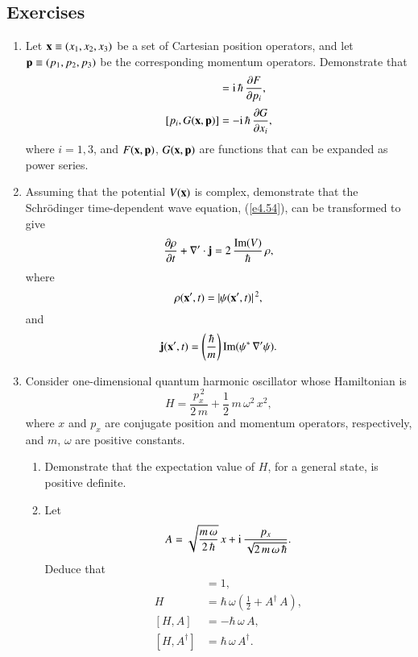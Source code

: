 \subsection*{Exercises}
\begin{enumerate}[label=\thechapter.\arabic*,leftmargin=*,widest=9.20]
\item Let  ${\bf x}\equiv (x_1, x_2, x_3)$ be a set of Cartesian position operators,  and let ${\bf p}\equiv (p_1, p_2, p_3)$ be
the corresponding momentum operators. Demonstrate that
\begin{align}
[x_i, F({\bf x},{\bf p})]& = {\rm i}\,\hbar \,\frac{\partial F}{\partial p_i},\nonumber\\[0.5ex]
[p_i, G({\bf x},{\bf p})]& = - {\rm i}\,\hbar\,\frac{\partial G}{\partial x_i},\nonumber
\end{align}
where $i=1,3$,  and $F({\bf x},{\bf p})$, $G({\bf x},{\bf p})$ are functions that can be expanded as  power series.

\item Assuming that the potential $V({\bf x})$ is complex, demonstrate that the Schr\"{o}dinger  time-dependent wave equation, (\ref{e4.54}), can be transformed to give
$$
\frac{\partial \rho}{\partial t} + \nabla'\cdot {\bf j} = 2\,\frac{{\rm Im}(V)}{\hbar}\,\rho,
$$
where 
$$
\rho({\bf x}',t)= |\psi({\bf x}',t)|^{\,2},
$$
and 
$$
{\bf j}({\bf x}', t) = \left(\frac{\hbar}{m} \right){\rm Im} (\psi^\ast \,\nabla' \psi).
$$

\item Consider  one-dimensional quantum harmonic oscillator whose Hamiltonian is \label{ex3.3}
$$
H = \frac{p_x^{\,2}}{2\,m}+ \frac{1}{2}\,m\,\omega^2\,x^2,
$$
where $x$ and $p_x$ are conjugate position and momentum operators, respectively, and $m$, $\omega$ are
positive constants. 

\begin{enumerate}
\item Demonstrate that the expectation value of $H$, for a general state, is
positive definite. 

\item Let 
$$
A = \sqrt{\frac{m\,\omega}{2\,\hbar}}\,x + {\rm i}\,\frac{p_x}{\sqrt{2\,m\,\omega\,\hbar}}.
$$
Deduce that 
\begin{align}
[A,A^\dag] &= 1,\nonumber\\[0.5ex]
H &=\hbar\,\omega\left(\frac{1}{2} + A^\dag\,A\right),\nonumber\\[0.5ex]
[H,A] &=-\hbar\,\omega\,A,\nonumber\\[0.5ex]
[H,A^\dag] &= \hbar\,\omega\,A^\dag.\nonumber
\end{align}


\end{enumerate}
\end{enumerate}
